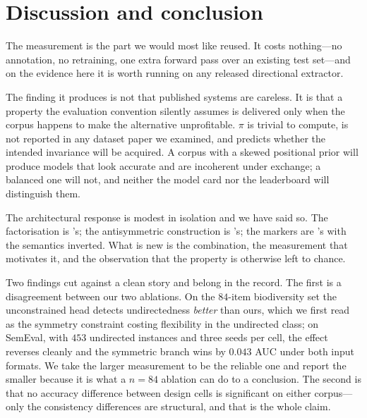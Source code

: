 \documentclass[11pt]{article}
\begin{document}
\section{Discussion and conclusion}
\label{sec:discussion}

The measurement is the part we would most like reused. It costs nothing---no annotation, no
retraining, one extra forward pass over an existing test set---and on the evidence here it is
worth running on any released directional extractor.

The finding it produces is not that published systems are careless. It is that a property the
evaluation convention silently assumes is delivered only when the corpus happens to make the
alternative unprofitable. $\pi$ is trivial to compute, is not reported in any dataset paper we
examined, and predicts whether the intended invariance will be acquired. A corpus with a skewed
positional prior will produce models that look accurate and are incoherent under exchange; a
balanced one will not, and neither the model card nor the leaderboard will distinguish them.

The architectural response is modest in isolation and we have said so. The factorisation is
\citeauthor{rink2010utd}'s; the antisymmetric construction is \citeauthor{rigutini2011sortnet}'s;
the markers are \citeauthor{zhou2021improved}'s with the semantics inverted. What is new is the
combination, the measurement that motivates it, and the observation that the property is
otherwise left to chance.

Two findings cut against a clean story and belong in the record. The first is a disagreement
between our two ablations. On the $84$-item biodiversity set the unconstrained head detects
undirectedness \emph{better} than ours, which we first read as the symmetry constraint costing
flexibility in the undirected class; on SemEval, with $453$ undirected instances and three
seeds per cell, the effect reverses cleanly and the symmetric branch wins by $0.043$ AUC under
both input formats. We take the larger measurement to be the reliable one and report the
smaller because it is what a $n=84$ ablation can do to a conclusion. The second is that no
accuracy difference between design cells is significant on either corpus---only the
consistency differences are structural, and that is the whole claim.
\end{document}
